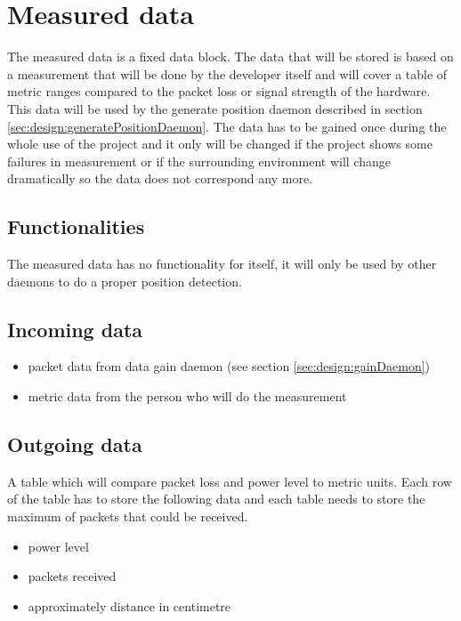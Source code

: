   \section{Measured data}
   \label{sec:design:measuredData}
   The measured data is a fixed data block. The data that will be stored is based on a measurement that will be done by the developer itself and will cover a table of metric ranges compared to the packet loss or signal strength of the hardware. This data will be used by the generate position daemon described in section \ref{sec:design:generatePositionDaemon}. The data has to be gained once during the whole use of the project and it only will be changed if the project shows some failures in measurement or if the surrounding environment will change dramatically so the data does not correspond any more.

   \subsection{Functionalities}
    The measured data has no functionality for itself, it will only be used by other daemons to do a proper position detection.

   \subsection{Incoming data}
    \begin{itemize}
     \item packet data from data gain daemon (see section \ref{sec:design:gainDaemon})
     \item metric data from the person who will do the measurement
    \end{itemize}

   \subsection{Outgoing data}
    A table which will compare packet loss and power level to metric units. Each row of the table has to store the following data and each table needs to store the maximum of packets that could be received.
    \begin{itemize}
     \item power level
     \item packets received
     \item approximately distance in centimetre
    \end{itemize}

